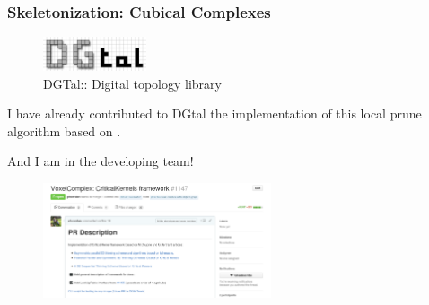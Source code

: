 \documentclass[9pt]{beamer}
\begin{document}
\begin{frame}[t]
  \frametitle{Skeletonization: Cubical Complexes}
    \begin{figure}[h]
      \centering
      \includegraphics[height=1cm]{./Figures/software_logos/dgtalLogo.png}
      \caption*{DGTal:: Digital topology library}
    \end{figure}
    I have already contributed to DGtal the implementation of this local prune algorithm based on \citep{couprie_3d_2015}.

    And I am in the developing team!
    \begin{figure}[h]
      \includegraphics[width=0.6\textwidth]{./Figures/skeleton/dgtalGithub.png}
    \end{figure}
\end{frame}
\end{document}
